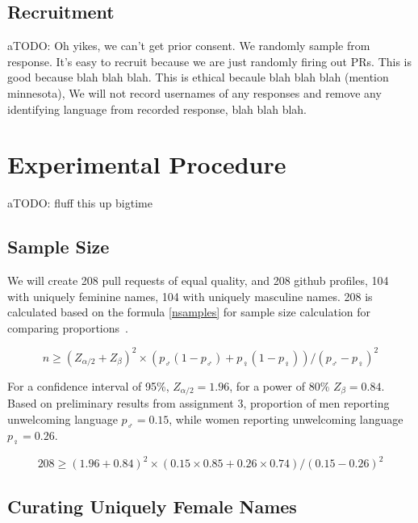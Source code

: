\documentclass[journal,12pt,onecolumn,]{IEEEtran}
\begin{document}
\subsection{Recruitment}

aTODO: Oh yikes, we can't get prior consent. We randomly sample from response. It's easy to recruit because we are just randomly firing out PRs. This is good because blah blah blah. This is ethical becaule blah blah blah (mention minnesota), We will not record usernames of any responses and remove any identifying language from recorded response, blah blah blah.

\section{Experimental Procedure}

aTODO: fluff this up bigtime

\subsection{Sample Size}

We will create 208 pull requests of equal quality, and 208 github profiles, 104 with uniquely feminine names, 104 with uniquely masculine names.
208 is calculated based on the formula \ref{nsamples} for sample size calculation for comparing proportions~\cite{wang2007sample}.

\begin{equation} \label{nsamples}
    n \ge ( Z_{\alpha/2} + Z_{\beta} )^2 \times ( p_{\male} ( 1 - p_{\male} ) + p_{\female} ( 1 - p_{\female})) / ( p_{\male} - p_{\female})^2
\end{equation}

For a confidence interval of 95\%, $Z_{\alpha/2} = 1.96$, for a power of 80\% $Z_{\beta} = 0.84$.
Based on preliminary results from assignment 3, proportion of men reporting unwelcoming language $p_{\male} = 0.15$,
while women reporting unwelcoming language $p_{\female} = 0.26$.

\begin{equation}
    208 \ge (1.96 + 0.84)^2 \times (0.15 \times 0.85 + 0.26 \times 0.74) / (0.15 - 0.26)^2
\end{equation}

\subsection{Curating Uniquely Female Names}
\end{document}

